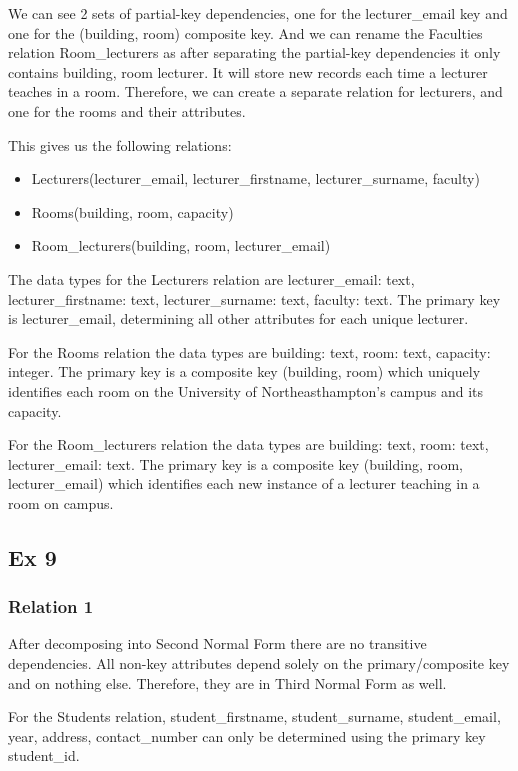 We can see 2 sets of partial-key dependencies, one for the lecturer_email key and one for the (building, room) composite key. And we can rename the Faculties relation Room_lecturers as after separating the partial-key dependencies it only contains building, room lecturer. It  will store new records each time a lecturer teaches in a room. Therefore, we can create a separate relation for lecturers, and one for the rooms and their attributes.

This gives us the following relations:

\begin{itemize}
    \item Lecturers(lecturer_email, lecturer_firstname, lecturer_surname, faculty)
    \item Rooms(building, room, capacity)
    \item Room_lecturers(building, room, lecturer_email)
\end{itemize}

The data types for the Lecturers relation are lecturer_email: text, lecturer_firstname: text, lecturer_surname: text, faculty: text. The primary key is lecturer_email, determining all other attributes for each unique lecturer.

For the Rooms relation the data types are building: text, room: text, capacity: integer. The primary key is a composite key (building, room) which uniquely identifies each room on the University of Northeasthampton’s campus and its capacity.

For the Room_lecturers relation the data types are building: text, room: text, lecturer_email: text. The primary key is a composite key (building, room, lecturer_email) which identifies each new instance of a lecturer teaching in a room on campus.


\subsection*{Ex 9}

\subsubsection*{Relation 1}
After decomposing into Second Normal Form there are no transitive dependencies. All non-key attributes depend solely on the primary/composite key and on nothing else. Therefore, they are in Third Normal Form as well.

For the Students relation, student_firstname, student_surname, student_email, year, address, contact_number can only be determined using the primary key student_id.

